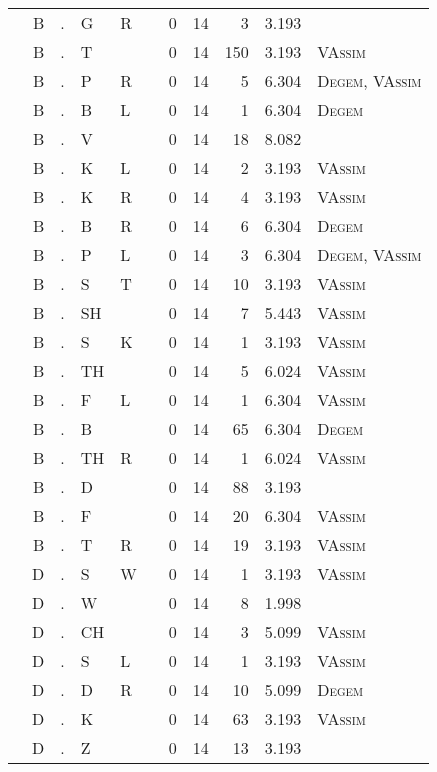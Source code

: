 \begin{longtable}{r@{ } r@{ } c@{ } l@{ } l@{ } l@{ } r r r r l }
 & B & . & G & R &  & 0 & 14 & 3 & 3.193 &  \\
 & B & . & T &  &  & 0 & 14 & 150 & 3.193 & \textsc{VAssim} \\
 & B & . & P & R &  & 0 & 14 & 5 & 6.304 & \textsc{Degem}, \textsc{VAssim} \\
 & B & . & B & L &  & 0 & 14 & 1 & 6.304 & \textsc{Degem} \\
 & B & . & V &  &  & 0 & 14 & 18 & 8.082 &  \\
 & B & . & K & L &  & 0 & 14 & 2 & 3.193 & \textsc{VAssim} \\
 & B & . & K & R &  & 0 & 14 & 4 & 3.193 & \textsc{VAssim} \\
 & B & . & B & R &  & 0 & 14 & 6 & 6.304 & \textsc{Degem} \\
 & B & . & P & L &  & 0 & 14 & 3 & 6.304 & \textsc{Degem}, \textsc{VAssim} \\
 & B & . & S & T &  & 0 & 14 & 10 & 3.193 & \textsc{VAssim} \\
 & B & . & SH &  &  & 0 & 14 & 7 & 5.443 & \textsc{VAssim} \\
 & B & . & S & K &  & 0 & 14 & 1 & 3.193 & \textsc{VAssim} \\
 & B & . & TH &  &  & 0 & 14 & 5 & 6.024 & \textsc{VAssim} \\
 & B & . & F & L &  & 0 & 14 & 1 & 6.304 & \textsc{VAssim} \\
 & B & . & B &  &  & 0 & 14 & 65 & 6.304 & \textsc{Degem} \\
 & B & . & TH & R &  & 0 & 14 & 1 & 6.024 & \textsc{VAssim} \\
 & B & . & D &  &  & 0 & 14 & 88 & 3.193 &  \\
 & B & . & F &  &  & 0 & 14 & 20 & 6.304 & \textsc{VAssim} \\
 & B & . & T & R &  & 0 & 14 & 19 & 3.193 & \textsc{VAssim} \\
 & D & . & S & W &  & 0 & 14 & 1 & 3.193 & \textsc{VAssim} \\
 & D & . & W &  &  & 0 & 14 & 8 & 1.998 &  \\
 & D & . & CH &  &  & 0 & 14 & 3 & 5.099 & \textsc{VAssim} \\
 & D & . & S & L &  & 0 & 14 & 1 & 3.193 & \textsc{VAssim} \\
 & D & . & D & R &  & 0 & 14 & 10 & 5.099 & \textsc{Degem} \\
 & D & . & K &  &  & 0 & 14 & 63 & 3.193 & \textsc{VAssim} \\
 & D & . & Z &  &  & 0 & 14 & 13 & 3.193 &  \\

\end{longtable}
